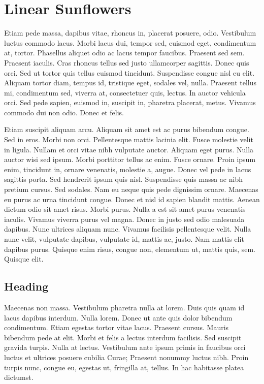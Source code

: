 \section{Linear Sunflowers}
Etiam pede massa, dapibus vitae, rhoncus in, placerat posuere, odio. Vestibulum luctus
commodo lacus. Morbi lacus dui, tempor sed, euismod eget, condimentum at, tortor.
Phasellus aliquet odio ac lacus tempor faucibus. Praesent sed sem. Praesent iaculis. Cras
rhoncus tellus sed justo ullamcorper sagittis. Donec quis orci. Sed ut tortor quis tellus
euismod tincidunt. Suspendisse congue nisl eu elit. Aliquam tortor diam, tempus id, tristique
eget, sodales vel, nulla. Praesent tellus mi, condimentum sed, viverra at, consectetuer quis,
lectus. In auctor vehicula orci. Sed pede sapien, euismod in, suscipit in, pharetra placerat,
metus. Vivamus commodo dui non odio. Donec et felis.

Etiam suscipit aliquam arcu. Aliquam sit amet est ac purus bibendum congue. Sed in eros.
Morbi non orci. Pellentesque mattis lacinia elit. Fusce molestie velit in ligula. Nullam et
orci vitae nibh vulputate auctor. Aliquam eget purus. Nulla auctor wisi sed ipsum. Morbi
porttitor tellus ac enim. Fusce ornare. Proin ipsum enim, tincidunt in, ornare venenatis,
molestie a, augue. Donec vel pede in lacus sagittis porta. Sed hendrerit ipsum quis nisl.
Suspendisse quis massa ac nibh pretium cursus. Sed sodales. Nam eu neque quis pede
dignissim ornare. Maecenas eu purus ac urna tincidunt congue.
Donec et nisl id sapien blandit mattis. Aenean dictum odio sit amet risus. Morbi purus.
Nulla a est sit amet purus venenatis iaculis. Vivamus viverra purus vel magna. Donec in
justo sed odio malesuada dapibus. Nunc ultrices aliquam nunc. Vivamus facilisis pellentesque
velit. Nulla nunc velit, vulputate dapibus, vulputate id, mattis ac, justo. Nam mattis elit
dapibus purus. Quisque enim risus, congue non, elementum ut, mattis quis, sem. Quisque
elit.

\subsection{Heading}
Maecenas non massa. Vestibulum pharetra nulla at lorem. Duis quis quam id lacus dapibus
interdum. Nulla lorem. Donec ut ante quis dolor bibendum condimentum. Etiam egestas
tortor vitae lacus. Praesent cursus. Mauris bibendum pede at elit. Morbi et felis a lectus
interdum facilisis. Sed suscipit gravida turpis. Nulla at lectus. Vestibulum ante ipsum
primis in faucibus orci luctus et ultrices posuere cubilia Curae; Praesent nonummy luctus
nibh. Proin turpis nunc, congue eu, egestas ut, fringilla at, tellus. In hac habitasse platea
dictumst.

